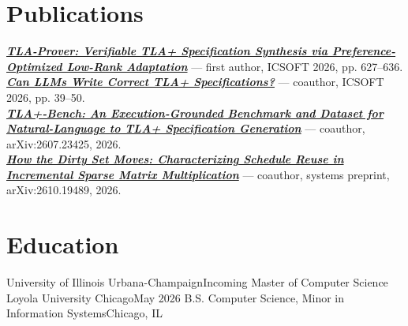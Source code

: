 \documentclass[letterpaper,11pt]{article}
\begin{document}
\section*{Publications}
\begin{itemize}[leftmargin=0.15in, label={}]
  \small{\item{
    \href{https://doi.org/10.5220/0015234600004088}{\textbf{\emph{TLA-Prover: Verifiable TLA+ Specification Synthesis via Preference-Optimized Low-Rank Adaptation}}} --- first author, ICSOFT 2026, pp. 627--636. \\
    \href{https://doi.org/10.5220/0015070400004088}{\textbf{\emph{Can LLMs Write Correct TLA+ Specifications?}}} --- coauthor, ICSOFT 2026, pp. 39--50. \\
    \href{https://arxiv.org/abs/2607.23425}{\textbf{\emph{TLA+-Bench: An Execution-Grounded Benchmark and Dataset for Natural-Language to TLA+ Specification Generation}}} --- coauthor, arXiv:2607.23425, 2026. \\
    \href{https://arxiv.org/abs/2610.19489}{\textbf{\emph{How the Dirty Set Moves: Characterizing Schedule Reuse in Incremental Sparse Matrix Multiplication}}} --- coauthor, systems preprint, arXiv:2610.19489, 2026.
  }}
\end{itemize}

\section*{Education}
\resumeSubHeadingListStart
  \resumeSubheading
    {University of Illinois Urbana-Champaign}{Incoming}
    {Master of Computer Science}{}
  \resumeSubheading
    {Loyola University Chicago}{May 2026}
    {B.S. Computer Science, Minor in Information Systems}{Chicago, IL}
    \resumeItemListStart
    \resumeItemListEnd
\resumeSubHeadingListEnd
\end{document}
